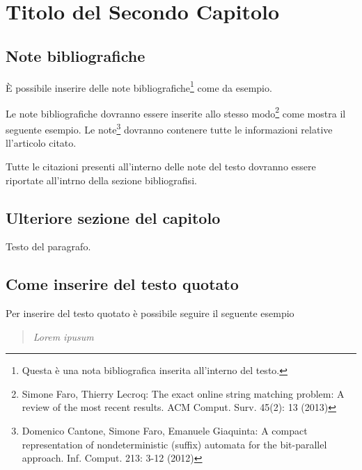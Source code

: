 \chapter{Titolo del Secondo Capitolo}
\vspace{4cm}


\section{Note bibliografiche}
\`E possibile inserire delle note bibliografiche\footnote{Questa \`e una nota bibliografica inserita all'interno del testo.} come da esempio.

Le note bibliografiche dovranno essere inserite allo stesso modo\footnote{Simone Faro, Thierry Lecroq: The exact online string matching problem: A review of the most recent results. ACM Comput. Surv. 45(2): 13 (2013)} come mostra il seguente esempio. 
Le note\footnote{Domenico Cantone, Simone Faro, Emanuele Giaquinta: A compact representation of nondeterministic (suffix) automata for the bit-parallel approach. Inf. Comput. 213: 3-12 (2012)} dovranno contenere tutte le informazioni relative ll'articolo citato. 

Tutte le citazioni presenti all'interno delle note del testo dovranno essere riportate all'intrno della sezione bibliografisi.
\section{Ulteriore sezione del capitolo}
Testo del paragrafo.


\section{Come inserire del testo quotato}

Per inserire del testo quotato \`e possibile seguire il seguente esempio

\begin{quote}
\emph{Lorem ipusum}
\end{quote}



